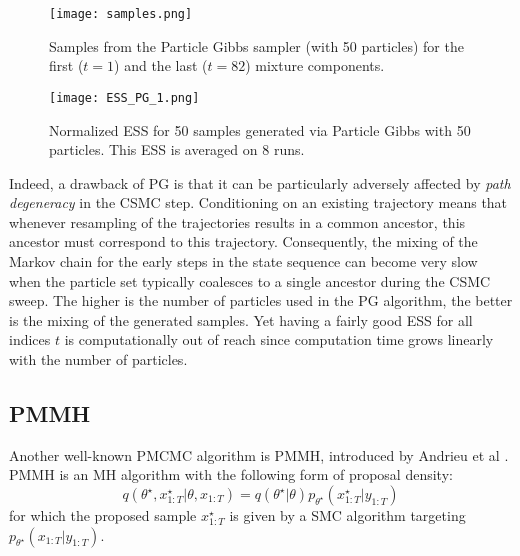 \begin{figure}[h!]
\centering
\texttt{[image: samples.png]}
    \caption{Samples from the Particle Gibbs sampler (with 50 particles) for the first ($t=1$) and the last ($t=82$) mixture components.}
    \label{fig:posterior_samples_time}
\end{figure}


\begin{figure}[h!]
\centering
    \texttt{[image: ESS\_PG\_1.png]}
    \caption{Normalized \acrfull{ESS} for 50 samples generated via Particle Gibbs with 50 particles. This \gls{ESS} is averaged on 8 runs.}
    \label{fig:ess}
\end{figure}



Indeed, a drawback of \gls{PG} is that it can be particularly adversely affected by \textit{path degeneracy} in the \gls{CSMC} step. Conditioning on an existing trajectory means that whenever resampling of the trajectories results in a common ancestor, this ancestor must correspond to this trajectory. Consequently, the mixing of the Markov chain for the early steps in the state sequence can become very slow when the particle set typically coalesces to a single ancestor during the \gls{CSMC} sweep.
The higher is the number of particles used in the \acrlong{PG} algorithm, the better is the mixing of the generated samples. Yet having a fairly good \gls{ESS} for all indices $t$ is computationally out of reach since computation time grows linearly with the number of particles.

\subsection{\acrlong{PMMH}}
Another well-known \gls{PMCMC} algorithm is \gls{PMMH}, introduced by Andrieu et al \cite{Andrieu:2010gc}.
\gls{PMMH} is an \acrlong{MH} algorithm with the following form of proposal density:
$$ q\left( \theta^\star, x_{1:T}^\star | \theta, x_{1:T} \right) = q(\theta^\star|\theta) p_{\theta^\star}(x_{1:T}^\star|y_{1:T})$$
for which the proposed sample $x_{1:T}^\star$ is given by a \gls{SMC} algorithm targeting $p_{\theta^\star}(x_{1:T}|y_{1:T})$.

